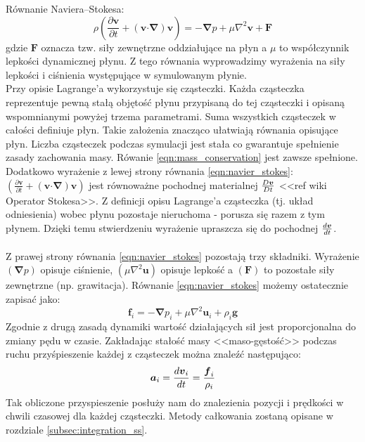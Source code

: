 {\sc Równanie Naviera--Stokesa:}
\begin{equation}
\rho \left( \frac{\partial \boldsymbol{v}}{\partial t} + \left( \boldsymbol{v} \boldsymbol{\cdot} \boldsymbol{\nabla} \right) \boldsymbol{v} \right) = -\boldsymbol{\nabla} p + \mu \nabla^{2} \boldsymbol{v} + \boldsymbol{F}
\label{eqn:navier_stokes}
\end{equation}
gdzie $\boldsymbol{F}$ oznacza tzw. siły zewnętrzne oddziałujące na płyn a $\mu$ to współczynnik lepkości dynamicznej płynu. Z tego równania wyprowadzimy wyrażenia na siły lepkości i ciśnienia występujące w symulowanym płynie.\\
Przy opisie Lagrange'a wykorzystuje się cząsteczki. Każda cząsteczka reprezentuje pewną stałą objętość płynu przypisaną do tej cząsteczki i opisaną wspomnianymi powyżej trzema parametrami. Suma wszystkich cząsteczek w całości definiuje płyn. Takie założenia znacząco ułatwiają równania opisujące płyn. Liczba cząsteczek podczas symulacji jest stała co gwarantuje spełnienie zasady zachowania masy. Rówanie \eqref{eqn:mass_conservation} jest zawsze spełnione. Dodatkowo wyrażenie z lewej strony równania \eqref{eqn:navier_stokes}: $\left( \frac{\partial \boldsymbol{v}}{\partial t} + \left( \boldsymbol{v} \boldsymbol{\cdot} \boldsymbol{\nabla} \right) \boldsymbol{v} \right)$ jest równoważne pochodnej materialnej ${D\boldsymbol{v} \over Dt}$ <<ref wiki Operator Stokesa>>. Z definicji opisu Lagrange'a cząsteczka (tj. układ odniesienia) wobec płynu pozostaje nieruchoma - porusza się razem z tym płynem. Dzięki temu stwierdzeniu wyrażenie upraszcza się do pochodnej ${d\boldsymbol{v} \over dt}$.
\par

\paragraph{}
Z prawej strony równania \eqref{eqn:navier_stokes} pozostają trzy składniki. Wyrażenie $\left( \boldsymbol{\nabla} p \right)$ opisuje ciśnienie, $\left( \mu \nabla^{2} \boldsymbol{u} \right)$ opisuje lepkość a $\left( \boldsymbol{F} \right)$ to pozostałe siły zewnętrzne (np. grawitacja). Równanie \eqref{eqn:navier_stokes} możemy ostatecznie zapisać jako:
\begin{equation}
\boldsymbol{f}_i = -\boldsymbol{\nabla} p_i + \mu \nabla^{2} \boldsymbol{u}_i + \rho_i \boldsymbol{g}
\label{eqn:navier_stokes_lagrangian}
\end{equation}
Zgodnie z drugą zasadą dynamiki wartość działających sił jest proporcjonalna do zmiany pędu w czasie. Zakładając stałość masy <<maso-gęstość>> podczas ruchu przyśpieszenie każdej z cząsteczek można znaleźć następująco:
\begin{equation}
\boldsymbol{a}_i = {d\boldsymbol{v}_i \over dt} = {\boldsymbol{f}_i \over \rho_i}
\label{eqn:acc}
\end{equation}
Tak obliczone przyspieszenie posłuży nam do znalezienia pozycji i prędkości w chwili czasowej dla każdej cząsteczki. Metody całkowania zostaną opisane w rozdziale \eqref{subsec:integration_ss}.
\par


